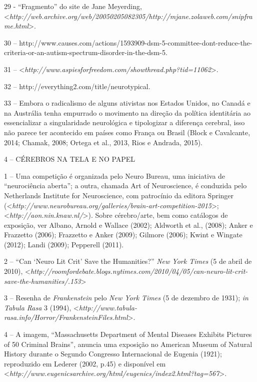 29 - ``Fragmento'' do site de Jane Meyerding,
\textless{}\emph{http://web.archive.org/web/20050205082305/http://mjane.zolaweb.com/snipframe.html}\textgreater{}.

30 --
http://www.causes.com/actions/1593909-dsm-5-committee-dont-reduce-the-criteria-or-an-autism-spectrum-disorder-in-the-dsm-5.

31 -- \textless{}\emph{http://www.aspiesforfreedom.com/showthread.php?tid=11062}\textgreater{}.

32 -- http://everything2.com/title/neurotypical.

33 -- Embora o radicalismo de alguns ativistas nos Estados Unidos, no
Canadá e na Austrália tenha empurrado o movimento na direção da política
identitária ao essencializar a singularidade neurológica e tipologizar a
diferença cerebral, isso não parece ter acontecido em países como França
ou Brasil (Block e Cavalcante, 2014; Chamak, 2008; Ortega et al., 2013,
Rios e Andrada, 2015).

4 -- CÉREBROS NA TELA E NO PAPEL

1 -- Uma competição é organizada pelo Neuro Bureau, uma iniciativa de
``neurociência aberta''; a outra, chamada Art of Neuroscience, é
conduzida pelo Netherlands Institute for Neuroscience, com patrocínio da
editora Springer
(\textless{}\emph{http://www.neurobureau.org/galleries/brain-art-competition-2015}\textgreater{};
\textless{}\emph{http://aon.nin.knaw.nl/}\textgreater{}). Sobre cérebro/arte, bem como catálogos
de exposição, ver Albano, Arnold e Wallace (2002); Aldworth et al.,
(2008); Anker e Frazzetto (2006); Frazzetto e Anker (2009); Gilmore
(2006); Kwint e Wingate (2012); Landi (2009); Pepperell (2011).

2 -- ``Can `Neuro Lit Crit' Save the Humanities?'' \emph{New York Times}
(5 de abril de 2010),
\textless{}\emph{http://roomfordebate.blogs.nytimes.com/2010/04/05/can-neuro-lit-crit-save-the-humanities/.153}\textgreater{}

3 -- Resenha de \emph{Frankenstein} pelo \emph{New York Times} (5 de
dezembro de 1931); \emph{in} \emph{Tabula Rasa} 3 (1994),
\textless{}\emph{http://www.tabula-rasa.info/Horror/FrankensteinFiles.html}\textgreater{}.

4 -- A imagem, ``Massachusetts Department of Mental Diseases Exhibits
Pictures of 50 Criminal Brains'', anuncia uma exposição no American
Museum of Natural History durante o Segundo Congresso Internacional de
Eugenia (1921); reproduzido em Lederer (2002, p.45) e disponível em
\textless{}\emph{http://www.eugenicsarchive.org/html/eugenics/index2.html?tag=567}\textgreater{}.

